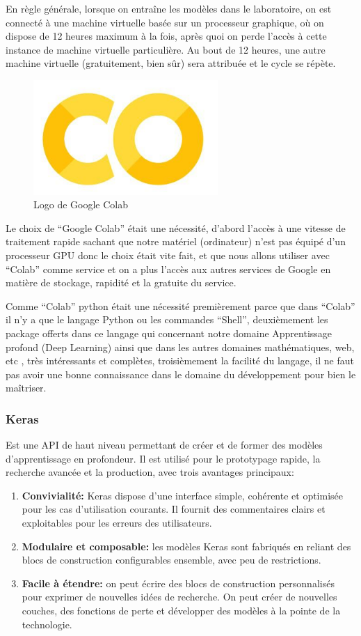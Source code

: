 \documentclass[12pt]{article}
\begin{document}
En règle générale, lorsque on entraîne les modèles dans le laboratoire, on est connecté à une machine virtuelle basée sur un processeur graphique, où on dispose de 12 heures maximum à la fois, après quoi on perde l'accès à cette instance de machine virtuelle particulière. Au bout de 12 heures, une autre machine virtuelle (gratuitement, bien sûr)  sera attribuée et le cycle se répète.

\begin{figure}[h]
	\centering
	\includegraphics[width=7cm]{img-Chapiter-4/colab.png}
	\caption{Logo de Google Colab}
\end{figure}

Le choix de “Google Colab” était une nécessité, d’abord l’accès à une vitesse de traitement rapide sachant que notre matériel (ordinateur) n’est pas équipé d’un processeur GPU donc le choix était vite fait, et que nous allons utiliser avec “Colab” comme service et on a plus l’accès aux autres services de Google en matière de stockage, rapidité et la gratuite du service.

Comme “Colab” python était une nécessité premièrement parce que dans “Colab” il n'y a que le langage Python ou les commandes “Shell”,  deuxièmement les package offerts  dans ce langage qui concernant notre domaine Apprentissage profond (Deep Learning) ainsi que dans les autres domaines mathématiques, web, etc , très intéressants et complètes,  troisièmement la facilité du langage, il ne faut pas avoir une bonne connaissance dans le domaine du développement pour bien le maîtriser.

\subsubsection*{Keras}
Est une API de haut niveau permettant de créer et de former des modèles d'apprentissage en profondeur. Il est utilisé pour le prototypage rapide, la recherche avancée et la production, avec trois avantages principaux:
\begin{enumerate}
	\item \textbf{Convivialité:} Keras dispose d'une interface simple, cohérente et optimisée pour les cas d'utilisation courants. Il fournit des commentaires clairs et exploitables pour les erreurs des utilisateurs.
	\item \textbf{Modulaire et composable:} les modèles Keras sont fabriqués en reliant des blocs de construction configurables ensemble, avec peu de restrictions.
	\item \textbf{Facile à étendre:} on peut écrire des blocs de construction personnalisés pour exprimer de nouvelles idées de recherche. On peut créer de nouvelles couches, des fonctions de perte et développer des modèles à la pointe de la technologie.
\end{enumerate}
\end{document}

